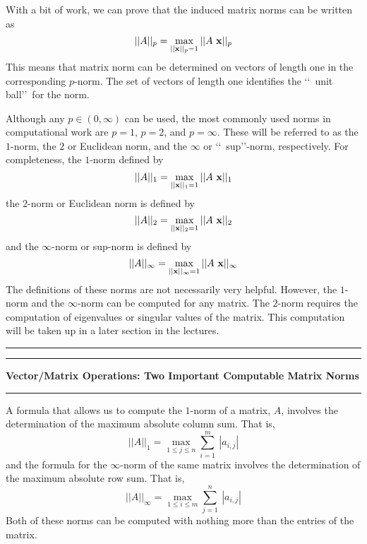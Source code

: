 \documentclass[10pt,fleqn]{article}
\begin{document}
With a bit of work, we can prove that the induced matrix norms can be written 
as
$$
  || A ||_p = \max_{ || {\bf x} ||_p = 1 } || A\ {\bf x} ||_p
$$ 
This means that matrix norm can be determined on vectors of length one in the
corresponding $p$-norm. The set of vectors of length one identifies the
\lq\lq\ unit ball\rq\rq\ for the norm.

Although any $p\in (0,\infty)$ can be used, the most commonly used norms in
computational work are $p=1$, $p=2$, and $p=\infty$. These will be referred to
as the $1$-norm, the $2$ or Euclidean norm, and the $\infty$ or
\lq\lq\ sup\rq\rq-norm, respectively. For completeness, the $1$-norm defined
by
$$
  || A ||_1 = \max_{ || {\bf x} ||_1 = 1 } || A\ {\bf x} ||_1
$$
the $2$-norm or Euclidean norm is defined by
$$
  || A ||_2 = \max_{ || {\bf x} ||_2 = 1 } || A\ {\bf x} ||_2
$$
and the $\infty$-norm or sup-norm is defined by
$$
  || A ||_\infty = \max_{ || {\bf x} ||_\infty = 1 } || A\ {\bf x} ||_\infty
$$
The definitions of these norms are not necessarily very helpful. However, the
$1$-norm and the $\infty$-norm can be computed for any matrix. The $2$-norm
requires the computation of eigenvalues or singular values of the matrix. This
computation will be taken up in a later section in the lectures. 
\vskip0.1in\hrule\vskip0.1in
\newpage
\vskip0.1in\hrule\vskip0.1in
\noindent
{\bf Vector/Matrix Operations: Two Important Computable Matrix Norms}
\vskip0.1in\hrule\vskip0.1in
\noindent
A formula that allows us to compute the $1$-norm of a matrix, $A$, involves the
determination of the maximum absolute column sum. That is,
$$
  || A ||_1 = \max_{1\leq j\leq n} \sum_{i=1}^m\ | a_{i,j} |
$$
and the formula for the $\infty$-norm of the same matrix involves the
determination of the maximum absolute row sum. That is,
$$
  || A ||_\infty = \max_{1\leq i\leq m} \sum_{j=1}^n\ | a_{i,j} |
$$
Both of these norms can be computed with nothing more than the entries of the
matrix.
\end{document}
